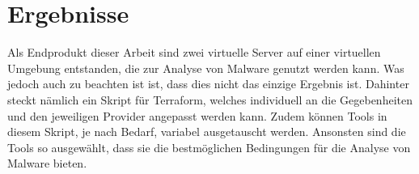 \section{Ergebnisse}
Als Endprodukt dieser Arbeit sind zwei virtuelle Server auf einer virtuellen Umgebung entstanden, die zur Analyse von Malware genutzt werden kann. Was jedoch auch zu beachten ist ist, dass dies nicht das einzige Ergebnis ist. Dahinter steckt nämlich ein Skript für Terraform, welches individuell an die Gegebenheiten und den jeweiligen Provider angepasst werden kann. Zudem können Tools in diesem Skript, je nach Bedarf, variabel ausgetauscht werden. Ansonsten sind die Tools so ausgewählt, dass sie die bestmöglichen Bedingungen für die Analyse von Malware bieten.
\newpage